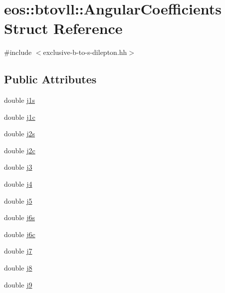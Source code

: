 \hypertarget{structeos_1_1btovll_1_1AngularCoefficients}{
\section{eos::btovll::AngularCoefficients Struct Reference}
\label{structeos_1_1btovll_1_1AngularCoefficients}
}


{\ttfamily \#include $<$exclusive-\/b-\/to-\/s-\/dilepton.hh$>$}\subsection*{Public Attributes}
\begin{DoxyCompactItemize}
\item 
double \hyperlink{structeos_1_1btovll_1_1AngularCoefficients_a288d113754d8142d7744445e9badfda2}{j1s}
\item 
double \hyperlink{structeos_1_1btovll_1_1AngularCoefficients_a0e4eabd3e2721e181cff61fb6f72da57}{j1c}
\item 
double \hyperlink{structeos_1_1btovll_1_1AngularCoefficients_ade959e061384e53621a55f9bac1f2c69}{j2s}
\item 
double \hyperlink{structeos_1_1btovll_1_1AngularCoefficients_a6963d2453fb5336232b76a477e0881c2}{j2c}
\item 
double \hyperlink{structeos_1_1btovll_1_1AngularCoefficients_afd8583c3d9cd7093df43785d27f6198b}{j3}
\item 
double \hyperlink{structeos_1_1btovll_1_1AngularCoefficients_a248d3de3ef06f5b0df8a81bb9b1cb386}{j4}
\item 
double \hyperlink{structeos_1_1btovll_1_1AngularCoefficients_a45c7c0b871babc4ab2d9f154621bcbba}{j5}
\item 
double \hyperlink{structeos_1_1btovll_1_1AngularCoefficients_a131fac85c7f41b3f45fa48d813cfe5fe}{j6s}
\item 
double \hyperlink{structeos_1_1btovll_1_1AngularCoefficients_a9864a2cce9206c5b1575506662e3931b}{j6c}
\item 
double \hyperlink{structeos_1_1btovll_1_1AngularCoefficients_a4315cb971112dcdab72fd3f35d32b0c1}{j7}
\item 
double \hyperlink{structeos_1_1btovll_1_1AngularCoefficients_ae45771328384f52d01da8de89ac47daa}{j8}
\item 
double \hyperlink{structeos_1_1btovll_1_1AngularCoefficients_a316582a2eb00530ecde513187e29fe18}{j9}
\end{DoxyCompactItemize}


